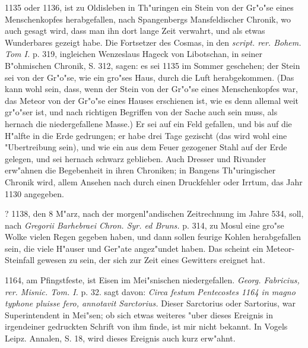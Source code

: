 \documentclass[a4paper, 11pt, oneside, polutonikogreek, german]{article}
\begin{document}
1135 oder 1136, ist zu Oldisleben in Th"uringen ein Stein von der Gr"o"se eines Menschenkopfes herabgefallen, nach Spangenbergs Mansfeldischer Chronik, wo auch gesagt wird, dass man ihn dort lange Zeit verwahrt, und als etwas Wunderbares gezeigt habe. Die Fortsetzer des Cosmas, in den \emph{script. rer. Bohem. Tom I.} p. 319, ingleichen Wenzeslaus Hageck von Libotschan, in seiner B"ohmischen Chronik, S. 312, sagen: es sei 1135 im Sommer geschehen; der Stein sei von der Gr"o"se, wie ein gro"ses Haus, durch die Luft herabgekommen. (Das kann wohl sein, dass, wenn der Stein von der Gr"o"se eines Menschenkopfes war, das Meteor von der Gr"o"se eines Hauses erschienen ist, wie es denn allemal weit gr"o"ser ist, und nach richtigen Begriffen von der Sache auch sein muss, als hernach die niedergefallene Masse.) Er sei auf ein Feld gefallen, und bis auf die H"alfte in die Erde gedrungen; er habe drei Tage gezischt (das wird wohl eine "Ubertreibung sein), und wie ein aus dem Feuer gezogener Stahl auf der Erde gelegen, und sei hernach schwarz geblieben. Auch Dresser und Rivander erw"ahnen die Begebenheit in ihren Chroniken; in Bangens Th"uringischer Chronik wird, allem Ansehen nach durch einen Druckfehler oder Irrtum, das Jahr 1130 angegeben.

? 1138, den 8 M"arz, nach der morgenl"andischen Zeitrechnung im Jahre 534, soll, nach \emph{Gregorii Barhebraei Chron. Syr. ed Bruns.} p. 314, zu Mosul eine gro"se Wolke vielen Regen gegeben haben, und dann sollen feurige Kohlen herabgefallen sein, die viele H"auser und Ger"ate angez"undet haben. Das scheint ein Meteor-Steinfall gewesen zu sein, der sich zur Zeit eines Gewitters ereignet hat.

1164, am Pfingstfeste, ist Eisen im Mei"snischen niedergefallen. \emph{Georg. Fabricius, rer. Misnic. Tom. I.} p. 32. sagt davon: \emph{Circa festum Pentecostes 1164 in magno typhone pluisse fero, annotavit Sarctorius.} Dieser Sarctorius oder Sartorius, war Superintendent in Mei"sen; ob sich etwas weiteres "uber dieses Ereignis in irgendeiner gedruckten Schrift von ihm finde, ist mir nicht bekannt. In Vogels Leipz. Annalen, S. 18, wird dieses Ereignis auch kurz erw"ahnt.
\end{document}

